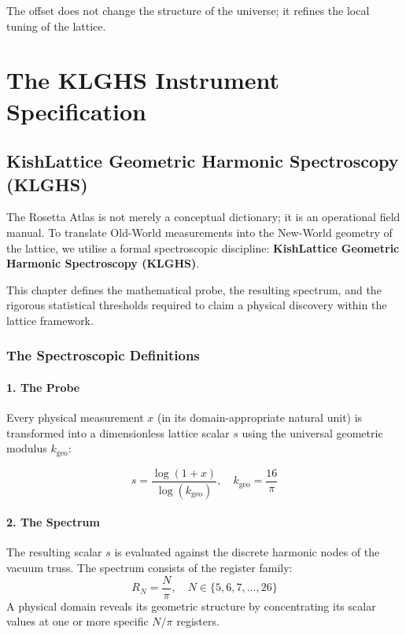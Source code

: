 \documentclass[12pt,oneside]{book}
\begin{document}
The offset does not change the structure of the universe; it refines the local
tuning of the lattice.

\newpage

\part{The KLGHS Instrument Specification}

\chapter{KishLattice Geometric Harmonic Spectroscopy (KLGHS)}

The Rosetta Atlas is not merely a conceptual dictionary; it is an operational field manual. To translate Old-World measurements into the New-World geometry of the lattice, we utilise a formal spectroscopic discipline: \textbf{KishLattice Geometric Harmonic Spectroscopy (KLGHS)}.

This chapter defines the mathematical probe, the resulting spectrum, and the rigorous statistical thresholds required to claim a physical discovery within the lattice framework.

\section{The Spectroscopic Definitions}

\subsection{1. The Probe}
Every physical measurement $x$ (in its domain-appropriate natural unit) is transformed into a dimensionless lattice scalar $s$ using the universal geometric modulus $k_\text{geo}$:

\begin{equation}
s = \frac{\log(1 + x)}{\log(k_{\text{geo}})}, \quad k_{\text{geo}} = \frac{16}{\pi}
\end{equation}

\subsection{2. The Spectrum}
The resulting scalar $s$ is evaluated against the discrete harmonic nodes of the vacuum truss. The spectrum consists of the register family:
\begin{equation}
R_N = \frac{N}{\pi}, \quad N \in \{5, 6, 7, \dots, 26\}
\end{equation}
A physical domain reveals its geometric structure by concentrating its scalar values at one or more specific $N/\pi$ registers.
\end{document}
